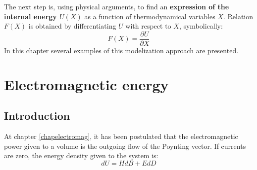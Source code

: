 \documentclass[12pt]{book}
\begin{document}
The next step is, using physical arguments, to find an {\bf expression of the
internal energy $U(X)$}
as a function of
thermodynamical variables $X$. Relation $F(X)$ is obtained by differentiating
$U$ with respect to $X$, symbolically:
\begin{equation}
F(X)=\frac{\partial U}{\partial X}
\end{equation}
In this chapter several examples of this modelization approach are presented.


\section{Electromagnetic energy}\label{secenergemag2}
\subsection{Introduction}
At chapter \ref{chapelectromag}, it has been postulated that the
electromagnetic power given to a volume is the outgoing flow of the Poynting
vector.
If currents are zero, the energy density
given to the system is:
\begin{equation}
dU=HdB+EdD
\end{equation}
\end{document}
